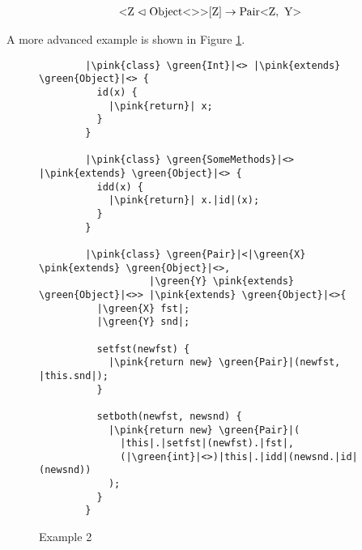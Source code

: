 \begin{align*}
    \text{<} \text{Z} \vartriangleleft \nvtt{Object}{}\text{>}[\text{Z}] \to \nvtt{Pair}{\text{Z}, \ \text{Y}}\\
\end{align*}

A more advanced example is shown in Figure \ref{example2}.

\begin{figure}[tp]
    \begin{verbatim}
        |\pink{class} \green{Int}|<> |\pink{extends} \green{Object}|<> {
          id(x) {
            |\pink{return}| x;
          }
        }

        |\pink{class} \green{SomeMethods}|<> |\pink{extends} \green{Object}|<> {
          idd(x) {
            |\pink{return}| x.|id|(x);
          }
        }

        |\pink{class} \green{Pair}|<|\green{X} \pink{extends} \green{Object}|<>,
                   |\green{Y} \pink{extends} \green{Object}|<>> |\pink{extends} \green{Object}|<>{
          |\green{X} fst|;
          |\green{Y} snd|;

          setfst(newfst) {
            |\pink{return new} \green{Pair}|(newfst, |this.snd|);
          }

          setboth(newfst, newsnd) {
            |\pink{return new} \green{Pair}|(
              |this|.|setfst|(newfst).|fst|,
              (|\green{int}|<>)|this|.|idd|(newsnd.|id|(newsnd))
            );
          }
        }
    \end{verbatim}
    \caption{Example 2}
    \label{example2}
\end{figure}

